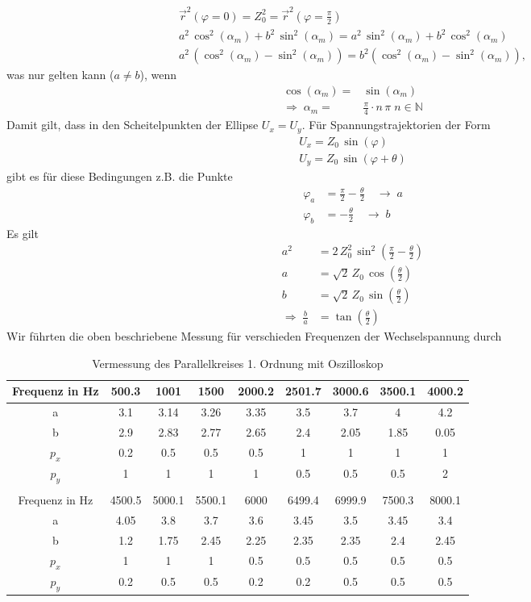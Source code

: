 \documentclass[a4paper, 12pt,]{scrartcl}
\begin{document}
\begin{align*}\vec{r}^2(\varphi=0)=Z_0^2=\vec{r}^2(\varphi=\frac{\pi}{2})\\
a^2\,\cos^2(\alpha_m)+b^2\,\sin^2(\alpha_m)=a^2\,\sin^2(\alpha_m)+b^2\,\cos^2(\alpha_m)\\
a^2\,(\cos^2(\alpha_m)-\sin^2(\alpha_m))=b^2(\cos^2(\alpha_m)-\sin^2(\alpha_m)),\end{align*}
was nur gelten kann ($a\neq{b}$), wenn
\begin{align*}\cos(\alpha_m)=&\sin(\alpha_m)\\
\Rightarrow\;\alpha_m=&\frac{\pi}{4}\cdot{n}\,\pi\;n\in\mathbb{N}\end{align*}
Damit gilt, dass in den Scheitelpunkten der Ellipse $U_x=U_y$. Für Spannungstrajektorien der Form 
\begin{align*}U_x=Z_0\,\sin(\varphi)\\
U_y=Z_0\,\sin(\varphi+\theta)\end{align*}
gibt es für diese Bedingungen z.B. die Punkte
\begin{align*}
\varphi_a&=\frac{\pi}{2}-\frac{\theta}{2}\quad\rightarrow\;a\\
\varphi_b&=-\frac{\theta}{2}\quad\rightarrow\;b\end{align*}
Es gilt
\begin{align*}
a^2&=2\,Z_0^2\,\sin^2(\frac{\pi}{2}-\frac{\theta}{2})\\
a&=\sqrt{2}\,Z_0\,\cos(\frac{\theta}{2})\\
b&=\sqrt{2}\,Z_0\,\sin(\frac{\theta}{2})\\
\Rightarrow\;\frac{b}{a}&=\tan(\frac{\theta}{2})
\end{align*}
Wir führten die oben beschriebene Messung für verschieden Frequenzen der Wechselspannung durch
\begin{table}[H]\centering\begin{tabular}{ |c | c | c | c | c | c | c | c | c | }\hline
Frequenz in Hz&500.3&	1001&	1500&	2000.2&	2501.7&	3000.6&	3500.1&	4000.2\\\hline\hline
a&3.1	&3.14	&3.26	&3.35	&3.5	&3.7	&4	&4.2\\\hline
b&2.9	&2.83	&2.77	&2.65	&2.4	&2.05	&1.85	&0.05\\\hline
$p_x$&0.2	&0.5	&0.5	&0.5	&1	&1	&1	&1\\\hline
$p_y$&1	&1	&1	&1	&0.5	&0.5	&0.5	&2\\\hline
\multicolumn{9}{c}{}\\\hline
Frequenz in Hz&	4500.5&	5000.1	&5500.1&	6000&	6499.4	&6999.9	&7500.3	&8000.1\\\hline\hline
a&4.05	&3.8	&3.7	&3.6	&3.45	&3.5	&3.45	&3.4\\\hline
b&1.2	&1.75	&2.45	&2.25	&2.35	&2.35	&2.4	&2.45\\\hline
$p_x$&1	&1	&1	&0.5	&0.5	&0.5	&0.5	&0.5\\\hline
$p_y$&0.2	&0.5	&0.5	&0.2	&0.2	&0.5	&0.5	&0.5\\\hline\end{tabular}
\caption{Vermessung des Parallelkreises 1. Ordnung mit Oszilloskop}\end{table}
\end{document}

